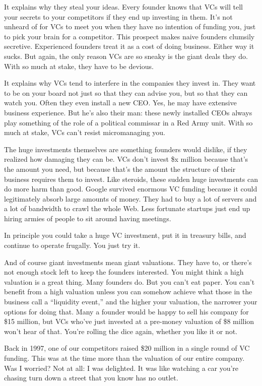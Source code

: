 It explains why they steal your ideas. Every founder knows that VCs will
tell your secrets to your competitors if they end up investing in them.
It's not unheard of for VCs to meet you when they have no intention of
funding you, just to pick your brain for a competitor. This prospect
makes naive founders clumsily secretive. Experienced founders treat it
as a cost of doing business. Either way it sucks. But again, the only
reason VCs are so sneaky is the giant deals they do. With so much at
stake, they have to be devious.

It explains why VCs tend to interfere in the companies they invest in.
They want to be on your board not just so that they can advise you, but
so that they can watch you. Often they even install a new CEO. Yes, he
may have extensive business experience. But he's also their man: these
newly installed CEOs always play something of the role of a political
commissar in a Red Army unit. With so much at stake, VCs can't resist
micromanaging you.

The huge investments themselves are something founders would dislike, if
they realized how damaging they can be. VCs don't invest \$x million
because that's the amount you need, but because that's the amount the
structure of their business requires them to invest. Like steroids,
these sudden huge investments can do more harm than good. Google
survived enormous VC funding because it could legitimately absorb large
amounts of money. They had to buy a lot of servers and a lot of
bandwidth to crawl the whole Web. Less fortunate startups just end up
hiring armies of people to sit around having meetings.

In principle you could take a huge VC investment, put it in treasury
bills, and continue to operate frugally. You just try it.

And of course giant investments mean giant valuations. They have to, or
there's not enough stock left to keep the founders interested. You might
think a high valuation is a great thing. Many founders do. But you can't
eat paper. You can't benefit from a high valuation unless you can
somehow achieve what those in the business call a ``liquidity event,''
and the higher your valuation, the narrower your options for doing that.
Many a founder would be happy to sell his company for \$15 million, but
VCs who've just invested at a pre-money valuation of \$8 million won't
hear of that. You're rolling the dice again, whether you like it or not.

Back in 1997, one of our competitors raised \$20 million in a single
round of VC funding. This was at the time more than the valuation of our
entire company. Was I worried? Not at all: I was delighted. It was like
watching a car you're chasing turn down a street that you know has no
outlet.

